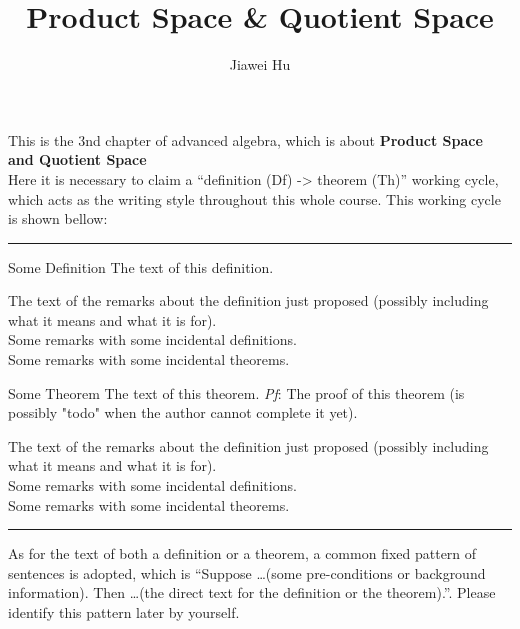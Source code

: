 \documentclass{article}
\title{\LARGE \textbf{Product Space \& Quotient Space}}
\author{\large Jiawei Hu}
\begin{document}
\maketitle

This is the 3nd chapter of advanced algebra, which is about \textbf{Product Space and Quotient Space}\\
Here it is necessary to claim a ``definition (Df) -> theorem (Th)'' working cycle, which acts as the writing style throughout this whole course. This working cycle is shown bellow:

\noindent\rule{\textwidth}{2pt}
\begin{Df}{Some Definition}
    The text of this definition.
\end{Df}

\begin{Rmk}{}
    The text of the remarks about the definition just proposed (possibly including what it means and what it is for).\\
    \textcolor{Df}{Some remarks with some incidental definitions.}\\
    \textcolor{Th}{Some remarks with some incidental theorems.}
\end{Rmk}

\begin{Th}{Some Theorem}
    The text of this theorem.
    \tcblower
    \textit{Pf}: The proof of this theorem (is possibly "todo" when the author cannot complete it yet).
\end{Th}

\begin{Rmk}{}
    The text of the remarks about the definition just proposed (possibly including what it means and what it is for).\\
    \textcolor{Df}{Some remarks with some incidental definitions.}\\
    \textcolor{Th}{Some remarks with some incidental theorems.}
\end{Rmk}
\noindent\rule{\textwidth}{2pt}
As for the text of both a definition or a theorem, a common fixed pattern of sentences is adopted, which is ``Suppose \dots (some pre-conditions or background information). Then \dots (the direct text for the definition or the theorem).''. Please identify this pattern later by yourself. 
\end{document}
